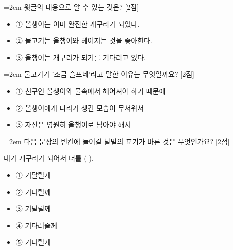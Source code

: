 \documentclass[12pt,a4paper]{article}
\newcommand{\qnum}[1]{%
  \tikz[baseline=(num.base)]{%
    \node[circle, fill=numCircle, text=white, inner sep=0pt,
          minimum size=18pt, font=\small\bfseries] (num) {#1};%
  }%
}
\newcommand{\pts}[1]{%
  \hfill\textcolor{ptsBadge}{[#1점]}%
}
\begin{document}
\vspace{3mm}
\begin{samepage}
{\hangindent=2em
\qnum{1}\enspace 윗글의 내용으로 알 수 있는 것은? \pts{2}
\par}

\vspace{3mm}
\begin{itemize}[leftmargin=2.5em, labelsep=0.3em, label={}, itemsep=4pt, parsep=1pt, topsep=0pt]
  \item ① 올챙이는 이미 완전한 개구리가 되었다.
  \item ② 물고기는 올챙이와 헤어지는 것을 좋아한다.
  \item ③ 올챙이는 개구리가 되기를 기다리고 있다.
\end{itemize}
\end{samepage}

\vspace{4mm}
\begin{samepage}
{\hangindent=2em
\qnum{2}\enspace 물고기가 '조금 슬프네'라고 말한 이유는 무엇일까요? \pts{2}
\par}

\vspace{3mm}
\begin{itemize}[leftmargin=2.5em, labelsep=0.3em, label={}, itemsep=4pt, parsep=1pt, topsep=0pt]
  \item ① 친구인 올챙이와 물속에서 헤어져야 하기 때문에
  \item ② 올챙이에게 다리가 생긴 모습이 무서워서
  \item ③ 자신은 영원히 올챙이로 남아야 해서
\end{itemize}
\end{samepage}

\vspace{4mm}
\begin{samepage}
{\hangindent=2em
\qnum{3}\enspace 다음 문장의 빈칸에 들어갈 낱말의 표기가 바른 것은 무엇인가요? \pts{2}
\par}

\vspace{3mm}
\begin{tcolorbox}[bogi]
내가 개구리가 되어서 너를 (          ).
\end{tcolorbox}
\vspace{3mm}
\begin{itemize}[leftmargin=2.5em, labelsep=0.3em, label={}, itemsep=4pt, parsep=1pt, topsep=0pt]
  \item ① 기달릴게
  \item ② 기다릴께
  \item ③ 기달릴께
  \item ④ 기다려줄께
  \item ⑤ 기다릴게
\end{itemize}
\end{samepage}
\end{document}
